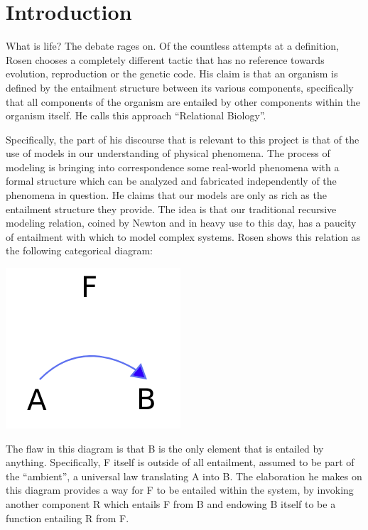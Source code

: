 \documentclass[12pt]{article}
\begin{document}
\maketitle

\section{Introduction}

What is life?  The debate rages on.  Of the countless attempts at a definition, Rosen \cite{Rosen} chooses a completely different tactic that has no reference towards evolution, reproduction or the genetic code.  His claim is that an organism is defined by the entailment structure between its various components, specifically that all components of the organism are entailed by other components within the organism itself.  He calls this approach ``Relational Biology''.  

Specifically, the part of his discourse that is relevant to this project is that of the use of models in our understanding of physical phenomena.  The process of modeling is bringing into correspondence some real-world phenomena with a formal structure which can be analyzed and fabricated independently of the phenomena in question.  He claims that our models are only as rich as the entailment structure they provide.  The idea is that our traditional recursive modeling relation, coined by Newton and in heavy use to this day, has a paucity of entailment with which to model complex systems.  Rosen shows this relation as the following categorical diagram:

\begin{center}
\includegraphics[scale=0.6]{newton.png}
\end{center}

The flaw in this diagram is that B is the only element that is entailed by anything.  Specifically, F itself is outside of all entailment, assumed to be part of the ``ambient'', a universal law translating A into B.  The elaboration he makes on this diagram provides a way for F to be entailed within the system, by invoking another component R which entails F from B and endowing B itself to be a function entailing R from F.  
\end{document}
